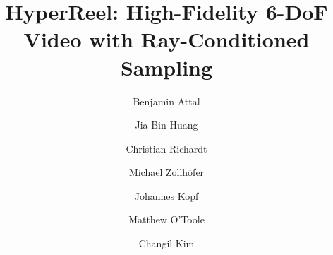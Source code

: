 \documentclass[10pt,twocolumn,letterpaper]{article}
\begin{document}
\newcommand{\mo}[1]{\textcolor{red}{[\texttt{Matt}: #1]}}
\newcommand{\MZ}[1]{\textcolor{red}{[\texttt{MZ}: #1]}}

\newcommand{\isdraft}{false}


\newcommand{\flux}{\Phi}
\newcommand{\normal}{\mathbf{n}}
\newcommand{\position}{\mathbf{x}}
\newcommand{\xpos}{\mathbf{x}}
\newcommand{\ypos}{\mathbf{y}}
\newcommand{\direction}{\boldsymbol{\omega}}
\newcommand{\dirin}{\direction_\text{i}}
\newcommand{\dirout}{\vec{\direction}}
\newcommand{\hemisphere}{\altmathcal{H}^2}
\newcommand{\withnorm}{[\normal]}
\newcommand{\withgeom}{[\normal_g]}
\newcommand{\withshading}{[\normal_s]}
\newcommand{\withboth}{[\normal_g, \normal_s]}
\newcommand{\inout}{\dirin \rightarrow \dirout}
\newcommand{\outin}{\dirout \rightarrow \dirin}
\newcommand{\emitted}{L_\text{e}}
\newcommand{\importance}{W_\text{e}}
\newcommand{\freeflight}{p_\text{ff}}
\newcommand{\im}{\mathrm{i}}
\newcommand{\tnear}{{t_\text{n}}}
\newcommand{\tfar}{{t_\text{f}}}
\newcommand{\network}{F_{\boldsymbol\theta}}
\newcommand{\rgbL}{L_{\text{RGB}}}
\newcommand{\irL}{L_{\text{IR}}}
\newcommand{\tofL}{L_{\text{ToF}}}
\newcommand{\rgbhatL}{\hat{L}_{\text{RGB}}}
\newcommand{\irhatL}{\hat{L}_{\text{IR}}}
\newcommand{\tofhatL}{\hat{L}_{\text{ToF}}}
\newcommand{\Iref}{I_{\text{s}}}
\newcommand{\timet}{\tau}
\newcommand{\latent}{\mathbf{z}}
\newcommand{\static}{\text{stat}}
\newcommand{\dynamic}{\text{dyn}}

\newcommand{\firstplane}{\pi^{xy}}
\newcommand{\secondplane}{\pi^{uv}}
\newcommand{\posenc}{\boldsymbol\gamma}
\newcommand{\ray}{\mathbf{r}}
\newcommand{\rayparam}{x, y, u, v}
\newcommand{\voxset}{\altmathcal{V}}
\newcommand{\vox}{\upsilon}
\newcommand{\col}{\mathbf{c}}

\newcommand{\mpage}[2]
{
\begin{minipage}{#1\linewidth}\centering
#2
\end{minipage}
} 
\title{
HyperReel: High-Fidelity 6-DoF Video with Ray-Conditioned Sampling
}








\author{\parbox{.2\linewidth}{\centering Benjamin Attal
}
\hspace{-3mm}\and\hspace{-3mm}
\parbox{.2\linewidth}{\centering Jia-Bin Huang}
\hspace{-3mm}\and\hspace{-3mm}
\parbox{.2\linewidth}{\centering Christian Richardt}
\hspace{-3mm}\and\hspace{-3mm}
\parbox{.2\linewidth}{\centering Michael Zollh\"ofer}
\hspace{-3mm}\and\hspace{-3mm}
\parbox{.2\linewidth}{\centering Johannes Kopf}
\hspace{-3mm}\and\hspace{-3mm}
\parbox{.2\linewidth}{\centering Matthew O'Toole}
\hspace{-3mm}\and\hspace{-3mm}
\parbox{.2\linewidth}{\centering Changil Kim}
}
\end{document}
